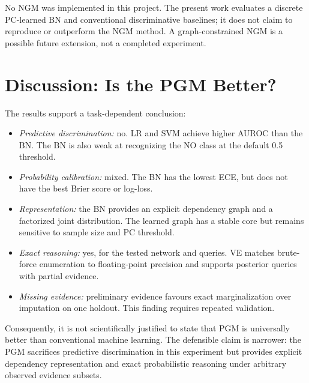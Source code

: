 \documentclass[conference]{IEEEtran}
\begin{document}
No NGM was implemented in this project. The present work evaluates a discrete PC-learned BN and conventional discriminative baselines; it does not claim to reproduce or outperform the NGM method. A graph-constrained NGM is a possible future extension, not a completed experiment.

\section{Discussion: Is the PGM Better?}
The results support a task-dependent conclusion:
\begin{itemize}
\item \textit{Predictive discrimination:} no. LR and SVM achieve higher AUROC than the BN. The BN is also weak at recognizing the NO class at the default 0.5 threshold.
\item \textit{Probability calibration:} mixed. The BN has the lowest ECE, but does not have the best Brier score or log-loss.
\item \textit{Representation:} the BN provides an explicit dependency graph and a factorized joint distribution. The learned graph has a stable core but remains sensitive to sample size and PC threshold.
\item \textit{Exact reasoning:} yes, for the tested network and queries. VE matches brute-force enumeration to floating-point precision and supports posterior queries with partial evidence.
\item \textit{Missing evidence:} preliminary evidence favours exact marginalization over imputation on one holdout. This finding requires repeated validation.
\end{itemize}
Consequently, it is not scientifically justified to state that PGM is universally better than conventional machine learning. The defensible claim is narrower: the PGM sacrifices predictive discrimination in this experiment but provides explicit dependency representation and exact probabilistic reasoning under arbitrary observed evidence subsets.
\end{document}
